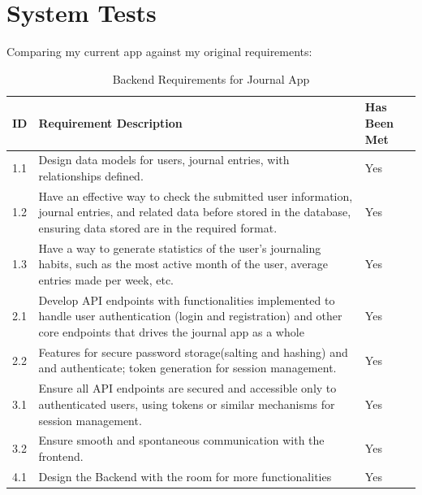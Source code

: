 \section{System Tests}
Comparing my current app against my original requirements:
\begin{table}[H]
    \centering
    \begin{tabular}{|l|p{8cm}|p{4cm}|}  
    \hline
    \textbf{ID} & \textbf{Requirement Description}& \textbf{Has Been Met} \\ \hline
    1.1 & Design data models for users, journal entries, with relationships defined. & Yes\\ \hline
    
    1.2 & Have an effective way to check the submitted user information, journal entries, and related data before stored in the database, ensuring data stored are in the required format. & Yes \\ \hline
    
    1.3 & Have a way to generate statistics of the user's journaling habits, such as the most active month of the user, average entries made per week, etc. & Yes \\ \hline
    
    2.1 & Develop API endpoints with functionalities implemented to handle user authentication (login and registration) and other core endpoints that drives the journal app as a whole & Yes\\ \hline
    
    2.2 & Features for secure password storage(salting and hashing) and and authenticate; token generation for session management.& Yes\\ \hline
    
    3.1 & Ensure all API endpoints are secured and accessible only to authenticated users, using tokens or similar mechanisms for session management.& Yes \\ \hline
    
    3.2 & Ensure smooth and spontaneous communication with the frontend. & Yes\\ \hline
    4.1 & Design the Backend with the room for more functionalities & Yes \\ \hline
    
    \end{tabular}
    \caption{Backend Requirements for Journal App}
\end{table}

